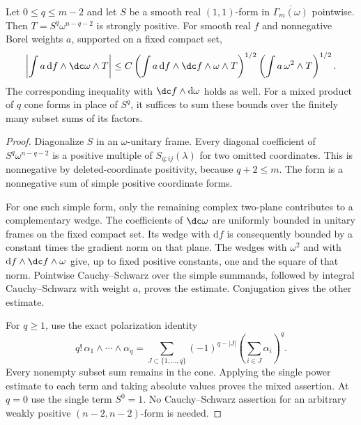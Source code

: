 \begin{lemma}\label{draft621:smooth-torsion}
Let $0\leq q\leq m-2$ and let $S$ be a smooth real $(1,1)$-form
in $\overline{\Gamma_m(\omega)}$ pointwise.
Then $T=S^q\omega^{n-q-2}$ is strongly positive. For smooth real $f$
and nonnegative Borel weights $a$, supported on a fixed compact set,
\[
 \left|\int a\,\mathrm df\wedge\dc\omega\wedge T\right|
 \leq C\left(\int a\,\mathrm df\wedge\dc f\wedge\omega\wedge T\right)^{1/2}
          \left(\int a\,\omega^2\wedge T\right)^{1/2}.
\]
The corresponding inequality with $\dc f\wedge\mathrm d\omega$
holds as well. For a mixed product of $q$ cone forms in place of
$S^q$, it suffices to sum these bounds over the finitely many
subset sums of its factors.
\end{lemma}
\begin{proof}
Diagonalize $S$ in an $\omega$-unitary frame. Every diagonal
coefficient of $S^q\omega^{n-q-2}$ is a positive multiple of
$S_{q;ij}(\lambda)$ for two omitted coordinates. This is nonnegative
by deleted-coordinate positivity, because $q+2\leq m$.
The form is a nonnegative sum of simple positive coordinate forms.

For one such simple form, only the remaining complex two-plane
contributes to a complementary wedge. The coefficients of
$\dc\omega$ are uniformly bounded in unitary frames on the fixed
compact set. Its wedge with $\mathrm df$ is consequently bounded
by a constant times the gradient norm on that plane. The wedges
with $\omega^2$ and with $\mathrm df\wedge\dc f\wedge\omega$
give, up to fixed positive constants, one and the square of that
norm. Pointwise Cauchy--Schwarz over the simple summands, followed
by integral Cauchy--Schwarz with weight $a$, proves the estimate.
Conjugation gives the other estimate.

For $q\geq1$, use the exact polarization identity
\[
 q!\,\alpha_1\wedge\cdots\wedge\alpha_q
   =\sum_{J\subset\{1,\ldots,q\}}
           (-1)^{q-|J|}\left(\sum_{i\in J}\alpha_i\right)^q.
\]
Every nonempty subset sum remains in the cone. Applying the single
power estimate to each term and taking absolute values proves the
mixed assertion. At $q=0$ use the single term $S^0=1$.
No Cauchy--Schwarz assertion for an arbitrary weakly positive
$(n-2,n-2)$-form is needed.
\end{proof}


